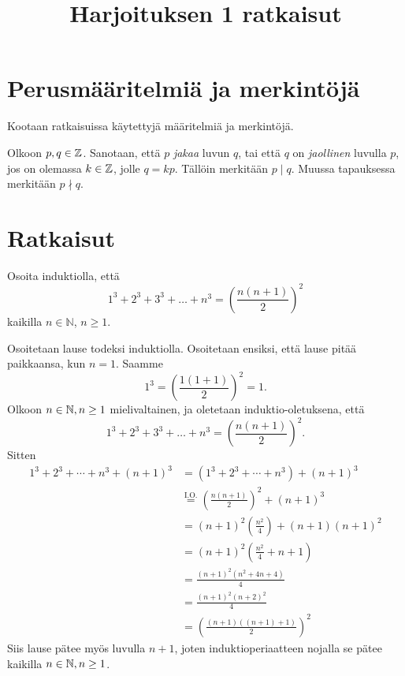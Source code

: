 \documentclass[12pt,a4paper]{article}
\title{Harjoituksen 1 ratkaisut}
\date{}
\author{}
\begin{document}
\maketitle

\noindent

\tableofcontents

\section{Perusmääritelmiä ja merkintöjä}

Kootaan ratkaisuissa käytettyjä määritelmiä ja merkintöjä.

\begin{definition}\label{def:divisibility}
  Olkoon \(p, q \in \mathbb{Z}\). Sanotaan, että \(p\) \emph{jakaa} luvun \(q\),
  tai että \(q\) on \emph{jaollinen} luvulla \(p\),
  jos on olemassa \(k \in \mathbb{Z}\), jolle \(q = kp\).
  Tällöin merkitään \(p \mid q\). Muussa tapauksessa merkitään
  \(p \nmid q\).
\end{definition}

\section{Ratkaisut}

\begin{exercise}
  Osoita induktiolla, että
  \[
    1^3 + 2^3 + 3^3 + \dots + n^3 =\left(\frac{n(n + 1)}{2}\right)^2
  \]
  kaikilla \(n \in \mathbb{N}\), \(n \geq 1\).
\end{exercise}

\begin{solution}
  Osoitetaan lause todeksi induktiolla. Osoitetaan ensiksi, että lause
  pitää paikkaansa, kun \(n = 1\). Saamme
  \[
    1^3 = \left(\frac{1(1 + 1)}{2}\right)^2 = 1.
  \]
  Olkoon \(n \in \mathbb{N}, n \geq 1\) mielivaltainen, ja oletetaan
  induktio-oletuksena, että
  \[
    1^3 + 2^3 + 3^3 + \dots + n^3 =\left(\frac{n(n + 1)}{2}\right)^2.
  \] Sitten
  \begin{align*}
    1^3 + 2^3 + \cdots + n^3 + (n + 1)^3
    &= (1^3 + 2^3 + \cdots + n^3) + (n + 1)^3 \\
    &\overset{\text{I.O.}}{=} \left(\frac{n(n + 1)}{2}\right)^2
    + (n + 1)^3 \\
    &= (n + 1)^2\left(\frac{n^2}{4}\right) + (n + 1)(n + 1)^2 \\
    &= (n + 1)^2\left(\frac{n^2}{4} + n + 1\right) \\
    &= \frac{(n + 1)^2(n^2 + 4n + 4)}{4} \\
    &= \frac{(n + 1)^2(n + 2)^2}{4} \\
    &= \left(\frac{(n + 1)((n + 1) + 1)}{2}\right)^2
  \end{align*}
  Siis lause pätee myös luvulla \(n + 1\), joten induktioperiaatteen nojalla
  se pätee kaikilla \(n \in \mathbb{N}, n \geq 1\).
\end{solution}
\end{document}
